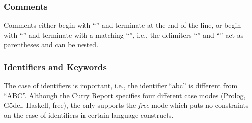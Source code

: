 \subsubsection{Comments}

Comments either begin with \enquote{\term{-{}-}} and terminate at the end
of the line,
or begin with \enquote{\term{\{-}} and terminate with a matching
\enquote{\term{-\}}}, i.e., the delimiters \enquote{\term{\{-}} and
\enquote{\term{-\}}} act as parentheses and can be nested.

\subsubsection{Identifiers and Keywords}

The case of identifiers is important, i.e., the identifier \enquote{abc}
is different from \enquote{ABC}.
Although the Curry Report specifies four different case modes
(Prolog, G\"odel, Haskell, free),
the \CYS only supports the \emph{free} mode
which puts no constraints on the case of identifiers in certain
language constructs.

